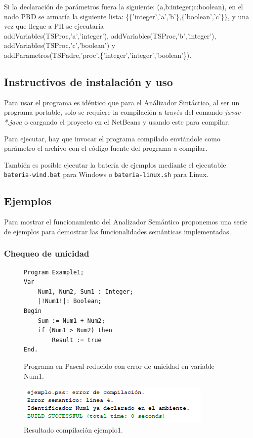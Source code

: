 Si la declaración de parámetros fuera la siguiente: (a,b:integer;c:boolean), en el nodo PRD se armaría la siguiente lista: \{\{'integer','a','b'\},\{'boolean','c'\}\}, y una vez que llegue a PH se ejecutaría \\ 
addVariables(TSProc,'a','integer'), addVariables(TSProc,'b','integer'), addVariables(TSProc,'c','boolean') y \\ addParametros(TSPadre,'proc',\{'integer','integer','boolean'\}). 

\subsection{Instructivos de instalación y uso}
Para usar el programa es idéntico que para el Análizador Sintáctico, al ser un programa portable, solo se requiere la compilación a través del comando \emph{javac *.java} o cargando el proyecto en el NetBeans y usando este para compilar.

Para ejecutar, hay que invocar el programa compilado enviándole como parámetro el archivo con el código fuente del programa a compilar.

También es posible ejecutar la batería de ejemplos mediante el ejecutable \texttt{bateria-wind.bat} para Windows o \texttt{bateria-linux.sh} para Linux.

\subsection{Ejemplos}
Para mostrar el funcionamiento del Analizador Semántico proponemos una serie de ejemplos para demostrar las funcionalidades semánticas implementadas.

\subsubsection{Chequeo de unicidad}
\begin{figure}[H]
\begin{verbatim}
Program Example1;
Var       
    Num1, Num2, Sum1 : Integer;
    |!Num1!|: Boolean;
Begin
    Sum := Num1 + Num2;
    if (Num1 > Num2) then
        Result := true
End.
\end{verbatim}
\caption{Programa en Pascal reducido con error de unicidad en variable Num1.}
\label{fig:semantico_ej_error_1}
\end{figure}

\begin{figure}[H]
\centering
\includegraphics[]{img/semantico/semantico_ej1.png}
\caption{Resultado compilación ejemplo1.}
\label{fig:semantico_ej1}
\end{figure}

